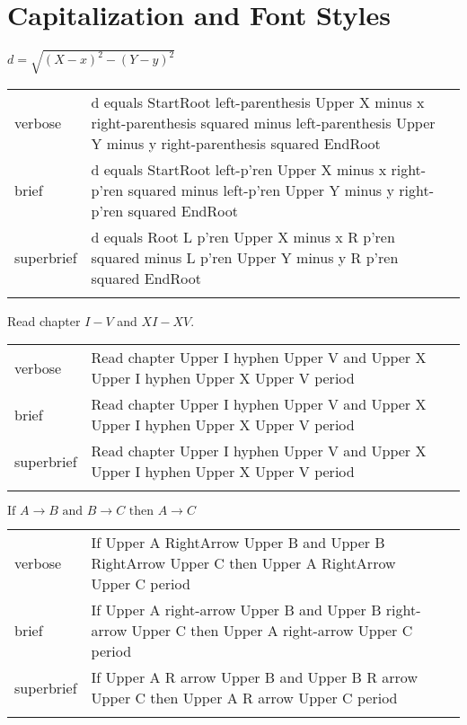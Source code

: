 \section{Capitalization and Font Styles}
\label{sec:cap}

\R
\E $d=\sqrt{(X-x)^2-(Y-y)^2}$
\begin{longtable}[c]{@{}lll@{}}
\toprule\addlinespace
verbose & d equals StartRoot left-parenthesis Upper X minus x
right-parenthesis squared minus left-parenthesis Upper Y minus y
right-parenthesis squared EndRoot &

\\\addlinespace
brief & d equals StartRoot left-p'ren Upper X minus x right-p'ren
squared minus left-p'ren Upper Y minus y right-p'ren squared EndRoot &

\\\addlinespace
superbrief & d equals Root L p'ren Upper X minus x R p'ren squared minus
L p'ren Upper Y minus y R p'ren squared EndRoot &

\\\addlinespace
\bottomrule
\end{longtable}



\R
\E Read chapter $I-V$ and $XI-XV$.
\begin{longtable}[c]{@{}ll@{}}
\toprule\addlinespace
verbose & Read chapter Upper I hyphen Upper V and Upper X Upper I hyphen
Upper X Upper V period
\\\addlinespace
brief & Read chapter Upper I hyphen Upper V and Upper X Upper I hyphen
Upper X Upper V period
\\\addlinespace
superbrief & Read chapter Upper I hyphen Upper V and Upper X Upper I
hyphen Upper X Upper V period
\\\addlinespace
\bottomrule
\end{longtable}


\R
\E $\mbox{If } A\to B \mbox{ and } B\to C \mbox{ then } A\to C$
\begin{longtable}[c]{@{}lll@{}}
\toprule\addlinespace
verbose & If Upper A RightArrow Upper B and Upper B RightArrow Upper C
then Upper A RightArrow Upper C period &

\\\addlinespace
brief & If Upper A right-arrow Upper B and Upper B right-arrow Upper C
then Upper A right-arrow Upper C period &

\\\addlinespace
superbrief & If Upper A R arrow Upper B and Upper B R arrow Upper C then
Upper A R arrow Upper C period &

\\\addlinespace
\bottomrule
\end{longtable}


